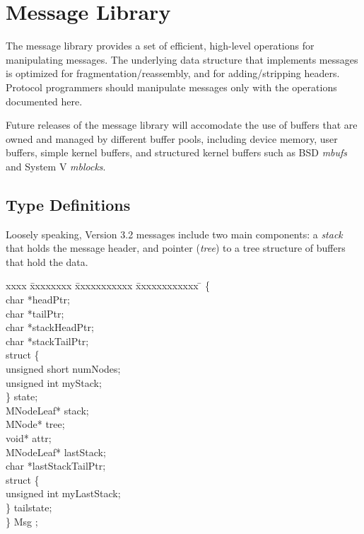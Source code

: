 % 
%
%

\section{Message Library}

The message library provides a set of efficient, high-level operations
for manipulating messages.  The underlying data structure that
implements messages is optimized for fragmentation/reassembly, and for
adding/stripping headers. 
Protocol
programmers should manipulate messages only with the operations
documented here.

Future releases of the message library will accomodate
the use of buffers that
are owned and managed by different buffer pools, including device
memory, user buffers, simple kernel buffers, and structured kernel
buffers such as BSD {\em mbufs} and System V {\em mblocks}.  

\subsection{Type Definitions}

Loosely speaking, Version 3.2 messages include two main components: a
{\it stack} that holds the message header, and pointer ({\it tree}) to
a tree structure of buffers that hold the data. 


\begin{tabbing}
xxxx \= xxxxxxxx \= xxxxxxxxxxx \= xxxxxxxxxxxx \= \kill
{} \{\\
\>\>  {\sem char}       \>*headPtr;\\
\>\>  {\sem char}       \>*tailPtr;\\
\>\>  {\sem char}       \>*stackHeadPtr;\\
\>\>  {\sem char}       \>*stackTailPtr;\\
\>\>  {\sem struct} \{\\
\>\>\>    {\sem unsigned short} \> numNodes;\\
\>\>\>    {\sem unsigned int}   \> myStack;\\
\>\>  \} state;\\
\>\>  {\sem MNodeLeaf}* \>stack;\\
\>\>  {\sem MNode}*     \>tree;\\
\>\>  {\sem void}*	\>attr;\\
\>\>  {\sem MNodeLeaf}* \>lastStack;\\
\>\>  {\sem char}       \>*lastStackTailPtr;\\
\>\>  {\sem struct} \{\\
\>\>\>    {\sem unsigned int}   \> myLastStack;\\
\>\>  \} tailstate;\\
\>\} {\bold Msg} ;
\end{tabbing}

